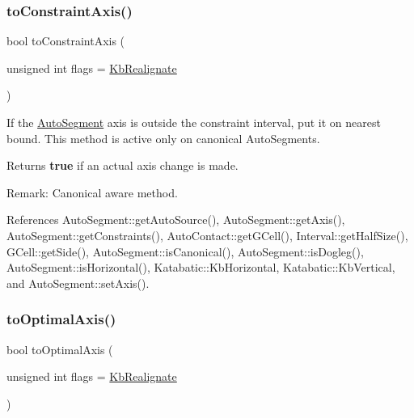 \subsubsection{\texorpdfstring{to\+Constraint\+Axis()}{toConstraintAxis()}}
{\footnotesize\ttfamily bool to\+Constraint\+Axis (\begin{DoxyParamCaption}\item[{unsigned int}]{flags = {\ttfamily \hyperlink{namespaceKatabatic_a2af2ad6b6441614038caf59d04b3b217a45a219697151531a23e997b11118e08a}{Kb\+Realignate}} }\end{DoxyParamCaption})}

If the \hyperlink{classKatabatic_1_1AutoSegment}{Auto\+Segment} axis is outside the constraint interval, put it on nearest bound. This method is active only on canonical Auto\+Segments.

\begin{DoxyReturn}{Returns}
{\bfseries true} if an actual axis change is made.
\end{DoxyReturn}
\begin{DoxyParagraph}{Remark\+:}
Canonical aware method. 
\end{DoxyParagraph}


References Auto\+Segment\+::get\+Auto\+Source(), Auto\+Segment\+::get\+Axis(), Auto\+Segment\+::get\+Constraints(), Auto\+Contact\+::get\+G\+Cell(), Interval\+::get\+Half\+Size(), G\+Cell\+::get\+Side(), Auto\+Segment\+::is\+Canonical(), Auto\+Segment\+::is\+Dogleg(), Auto\+Segment\+::is\+Horizontal(), Katabatic\+::\+Kb\+Horizontal, Katabatic\+::\+Kb\+Vertical, and Auto\+Segment\+::set\+Axis().

\mbox{\label{classKatabatic_1_1AutoSegment_a750983d7154c94b54537127a3a18e14b}} 
\subsubsection{\texorpdfstring{to\+Optimal\+Axis()}{toOptimalAxis()}}
{\footnotesize\ttfamily bool to\+Optimal\+Axis (\begin{DoxyParamCaption}\item[{unsigned int}]{flags = {\ttfamily \hyperlink{namespaceKatabatic_a2af2ad6b6441614038caf59d04b3b217a45a219697151531a23e997b11118e08a}{Kb\+Realignate}} }\end{DoxyParamCaption})}

